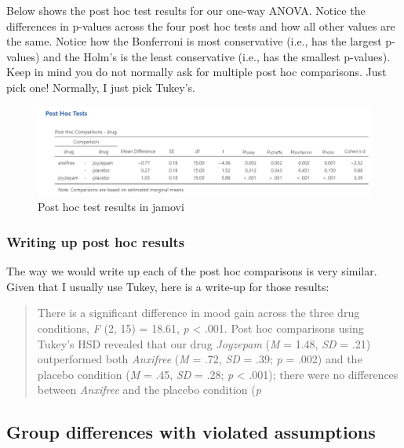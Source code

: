 \documentclass[
]{book}
\begin{document}
Below shows the post hoc test results for our one-way ANOVA. Notice the differences in p-values across the four post hoc tests and how all other values are the same. Notice how the Bonferroni is most conservative (i.e., has the largest p-values) and the Holm's is the least conservative (i.e., has the smallest p-values). Keep in mind you do not normally ask for multiple post hoc comparisons. Just pick one! Normally, I just pick Tukey's.

\begin{figure}

{\centering \includegraphics[width=1\linewidth]{images/04_one-way-anova/one-way_results_post-hoc} 

}

\caption{Post hoc test results in jamovi}\label{fig:unnamed-chunk-15}
\end{figure}

\hypertarget{writing-up-post-hoc-results}{%
\subsubsection{Writing up post hoc results}\label{writing-up-post-hoc-results}}

The way we would write up each of the post hoc comparisons is very similar. Given that I usually use Tukey, here is a write-up for those results:

\begin{quote}
There is a significant difference in mood gain across the three drug conditions, \emph{F} (2, 15) = 18.61, \emph{p} \textless{} .001. Post hoc comparisons using Tukey's HSD revealed that our drug \emph{Joyzepam} (\emph{M} = 1.48, \emph{SD} = .21) outperformed both \emph{Anxifree} (\emph{M} = .72, \emph{SD} = .39; \emph{p} = .002) and the placebo condition (\emph{M} = .45, \emph{SD} = .28; \emph{p} \textless{} .001); there were no differences between \emph{Anxifree} and the placebo condition (\emph{p}
\end{quote}

\hypertarget{group-differences-with-violated-assumptions}{%
\subsection{Group differences with violated assumptions}\label{group-differences-with-violated-assumptions}}
\end{document}
